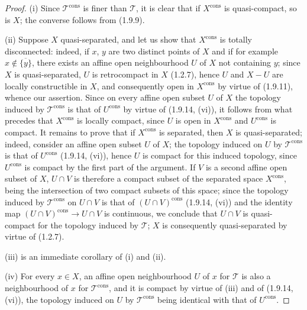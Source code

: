 \begin{proof}
(i) Since $\mathscr T^{\mathrm{cons}}$ is finer than $\mathscr T$, it is
clear that if $X^{\mathrm{cons}}$ is quasi-compact, so is $X$;
the converse follows from (1.9.9).

(ii) Suppose $X$ quasi-separated, and let us show that $X^{\mathrm{cons}}$ is
totally disconnected: indeed, if $x$, $y$ are two distinct points of
$X$ and if for example $x\notin\overline{\{y\}}$, there exists an
affine open neighbourhood $U$ of $X$ not containing $y$; since $X$ is
quasi-separated, $U$ is retrocompact in $X$ (1.2.7), hence $U$ and $X-U$ are
locally constructible in $X$, and consequently open in
$X^{\mathrm{cons}}$ by virtue of (1.9.11), whence our assertion. Since on
every affine open subset $U$ of $X$ the topology induced by
$\mathscr T^{\mathrm{cons}}$ is that of $U^{\mathrm{cons}}$ by virtue of
(1.9.14, (vi)), it follows from what precedes that $X^{\mathrm{cons}}$ is
locally compact, since $U$ is open in $X^{\mathrm{cons}}$ and
$U^{\mathrm{cons}}$ is compact. It remains to prove that if
$X^{\mathrm{cons}}$ is separated, then $X$ is quasi-separated; indeed,
consider an affine open subset $U$ of $X$; the topology induced on
$U$ by $\mathscr T^{\mathrm{cons}}$ is that of $U^{\mathrm{cons}}$
(1.9.14, (vi)), hence $U$ is compact for this induced topology, since
$U^{\mathrm{cons}}$ is compact by the first part of the argument. If
$V$ is a second affine open subset of $X$, $U\cap V$ is therefore a compact
subset of the separated space $X^{\mathrm{cons}}$, being the intersection of
two compact subsets of this space; since the topology induced by
$\mathscr T^{\mathrm{cons}}$ on $U\cap V$ is that of
$(U\cap V)^{\mathrm{cons}}$ (1.9.14, (vi)) and the identity map
$(U\cap V)^{\mathrm{cons}}\to U\cap V$ is continuous, we conclude that
$U\cap V$ is quasi-compact for the topology induced by $\mathscr T$; $X$
is consequently quasi-separated by virtue of (1.2.7).

(iii) is an immediate corollary of (i) and (ii).

(iv) For every $x\in X$, an affine open neighbourhood $U$ of $x$ for
$\mathscr T$ is also a neighbourhood of $x$ for $\mathscr T^{\mathrm{cons}}$,
and it is compact by virtue of (iii) and of (1.9.14, (vi)), the topology
induced on $U$ by $\mathscr T^{\mathrm{cons}}$ being identical with that of
$U^{\mathrm{cons}}$.


\end{proof}
